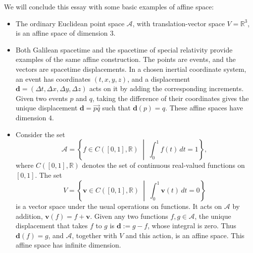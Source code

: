 \documentclass[12pt]{article}
\begin{document}
We will conclude this essay with some basic examples of affine space:

\begin{itemize}

  \item The ordinary Euclidean point space $\mathcal A$, with translation-vector
space $V=\mathbb R^3$, is an affine space of dimension $3$.
  \item Both Galilean spacetime and the spacetime of special relativity
provide examples of the same affine construction. The points are
events, and the vectors are spacetime displacements. In a chosen
inertial coordinate system, an event has coordinates $(t,x,y,z)$,
and a displacement $\mathbf d=(\Delta t,\Delta x,\Delta y,\Delta z)$ acts on it by
adding the corresponding increments. Given two events $p$ and $q$,
taking the difference of their coordinates gives the unique displacement
$\mathbf d=\overrightarrow{pq}$ such that $\mathbf d(p)=q$. These affine spaces have dimension $4$.
  \item Consider the set
\[
  \mathcal A
  =
  \left\{
    f\in C([0,1],\mathbb R)
    \;\middle|\;
    \int_0^1 f(t)\,dt=1
  \right\},
\]
where $C([0,1],\mathbb R)$ denotes the set of continuous real-valued
functions on $[0,1]$. The set
\[
  V
  =
  \left\{
    \mathbf v\in C([0,1],\mathbb R)
    \;\middle|\;
    \int_0^1 \mathbf v(t)\,dt=0
  \right\}
\]
is a vector space under the usual operations on functions. It acts on
$\mathcal A$ by addition, $\mathbf v(f)=f+\mathbf v$. Given any two functions
$f,g\in\mathcal A$, the unique displacement that takes $f$ to $g$ is
$\mathbf d:=g-f$, whose integral is zero. Thus $\mathbf d(f)=g$, and
$\mathcal A$, together with $V$ and this action, is an affine space. This affine space has infinite dimension.
\end{itemize}
\end{document}
